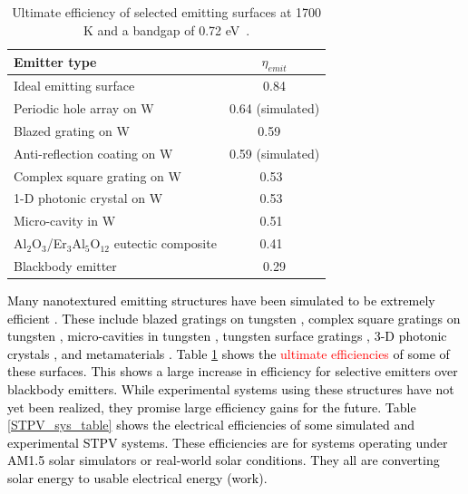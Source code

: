 \documentclass[review]{elsarticle}
\begin{document}
\begin{table}
	\caption{Ultimate efficiency of selected emitting surfaces at 1700 K and a bandgap of 0.72 eV~\cite{me_thesis}.}
	\label{FOM_table}
	\begin{center}
		\begin{tabular}{|lc|}
			\hline
			Emitter type & $\eta_{emit}$\\
			\hline	
			Ideal emitting surface & 0.84 \\
			Periodic hole array on W & 0.64 (simulated)\\
			Blazed grating on W & 0.59 ~\cite{me2} \\
			Anti-reflection coating on W & 0.59 (simulated) \\
			Complex square grating on W & 0.53~\cite{paper2_ref14}\\
			1-D photonic crystal on W & 0.53~\cite{SKY_JPE_2015}\\
			Micro-cavity in W & 0.51~\cite{paper2_ref6} \\
			{A}l$_2${O}$_3$/{E}r$_3${A}l$_5${O}$_{12}$ eutectic composite & 0.41~\cite{exp_tokyo}\\
			Blackbody emitter & 0.29\\
			\hline
		\end{tabular}
	\end{center}
\end{table}

\textcolor{black}{Many nanotextured emitting structures have been simulated to be extremely efficient \cite{paper2_ref13}.  These include blazed gratings on tungsten \cite{me2}, complex square gratings on tungsten \cite{paper2_ref14}, micro-cavities in tungsten \cite{paper2_ref6}, tungsten surface gratings \cite{paper1_ref6}, 3-D photonic crystals \cite{paper2_ref10}, and metamaterials \cite{meta}.  Table \ref{FOM_table} shows the \textcolor{red}{ultimate efficiencies} of some of these surfaces.  This shows a large increase in efficiency for selective emitters over blackbody emitters.  While experimental systems using these structures have not yet been realized, they promise large efficiency gains for the future.  Table \ref{STPV_sys_table} shows the electrical efficiencies of some simulated and experimental STPV systems. These efficiencies are for systems operating under AM1.5 solar simulators or real-world solar conditions.  They all are converting solar energy to usable electrical energy (work).}
\end{document}
